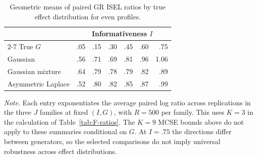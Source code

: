 \begin{table}[!ht]
\caption{Geometric means of paired GR ISEL ratios by true effect distribution for even profiles.}
\label{tab:F-robust}
\centering
\begin{tablebody}
\begin{tabular}{@{}lrrrrrr@{}}
\toprule
& \multicolumn{6}{c}{Informativeness $I$} \\
\cmidrule(lr){2-7}
True $G$ & .05 & .15 & .30 & .45 & .60 & .75 \\
\midrule
Gaussian & .56 & .71 & .69 & .81 & .96 & 1.06 \\
\addlinespace[5pt]
Gaussian mixture & .64 & .79 & .78 & .79 & .82 & .89 \\
\addlinespace[5pt]
Asymmetric Laplace & .52 & .80 & .82 & .85 & .87 & .99 \\
\bottomrule
\end{tabular}
\end{tablebody}
\par\vspace{0.4\baselineskip}
\begin{minipage}{\linewidth}\normalsize\doublespacing\raggedright
\textit{Note.} Each entry exponentiates the average paired log ratio across replications in the three $J$ families at fixed $(I,G)$, with $R=500$ per family. This uses $K=3$ in the calculation of Table~\ref{tab:F-ratios}. The $K=9$ MCSE bounds above do not apply to these summaries conditional on $G$. At $I=.75$ the directions differ between generators, so the selected comparisons do not imply universal robustness across effect distributions.
\end{minipage}
\end{table}

